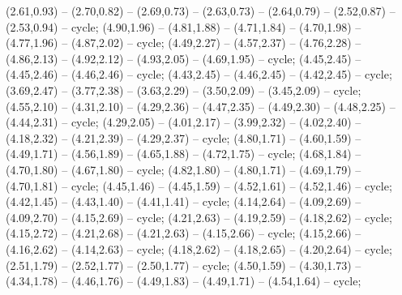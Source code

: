 { (2.61,0.93) -- (2.70,0.82) -- (2.69,0.73) -- (2.63,0.73) -- (2.64,0.79) -- (2.52,0.87) -- (2.53,0.94) -- cycle;
 (4.90,1.96) -- (4.81,1.88) -- (4.71,1.84) -- (4.70,1.98) -- (4.77,1.96) -- (4.87,2.02) -- cycle;
 (4.49,2.27) -- (4.57,2.37) -- (4.76,2.28) -- (4.86,2.13) -- (4.92,2.12) -- (4.93,2.05) -- (4.69,1.95) -- cycle;
 (4.45,2.45) -- (4.45,2.46) -- (4.46,2.46) -- cycle;
 (4.43,2.45) -- (4.46,2.45) -- (4.42,2.45) -- cycle;
 (3.69,2.47) -- (3.77,2.38) -- (3.63,2.29) -- (3.50,2.09) -- (3.45,2.09) -- cycle;
 (4.55,2.10) -- (4.31,2.10) -- (4.29,2.36) -- (4.47,2.35) -- (4.49,2.30) -- (4.48,2.25) -- (4.44,2.31) -- cycle;
 (4.29,2.05) -- (4.01,2.17) -- (3.99,2.32) -- (4.02,2.40) -- (4.18,2.32) -- (4.21,2.39) -- (4.29,2.37) -- cycle;
 (4.80,1.71) -- (4.60,1.59) -- (4.49,1.71) -- (4.56,1.89) -- (4.65,1.88) -- (4.72,1.75) -- cycle;
 (4.68,1.84) -- (4.70,1.80) -- (4.67,1.80) -- cycle;
 (4.82,1.80) -- (4.80,1.71) -- (4.69,1.79) -- (4.70,1.81) -- cycle;
 (4.45,1.46) -- (4.45,1.59) -- (4.52,1.61) -- (4.52,1.46) -- cycle;
 (4.42,1.45) -- (4.43,1.40) -- (4.41,1.41) -- cycle;
 (4.14,2.64) -- (4.09,2.69) -- (4.09,2.70) -- (4.15,2.69) -- cycle;
 (4.21,2.63) -- (4.19,2.59) -- (4.18,2.62) -- cycle;
 (4.15,2.72) -- (4.21,2.68) -- (4.21,2.63) -- (4.15,2.66) -- cycle;
 (4.15,2.66) -- (4.16,2.62) -- (4.14,2.63) -- cycle;
 (4.18,2.62) -- (4.18,2.65) -- (4.20,2.64) -- cycle;
 (2.51,1.79) -- (2.52,1.77) -- (2.50,1.77) -- cycle;
 (4.50,1.59) -- (4.30,1.73) -- (4.34,1.78) -- (4.46,1.76) -- (4.49,1.83) -- (4.49,1.71) -- (4.54,1.64) -- cycle;
}
